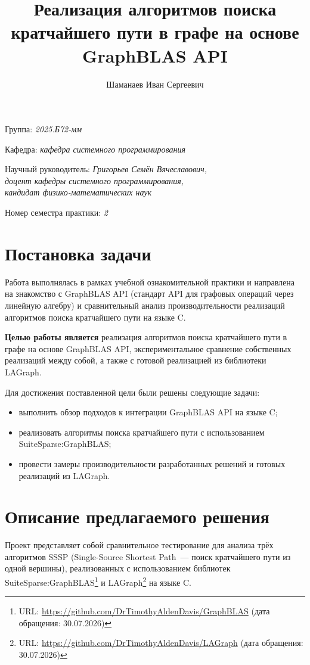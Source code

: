 \documentclass[a4paper]{article}
\title{Реализация алгоритмов поиска кратчайшего пути в графе на основе GraphBLAS API}
\author{Шаманаев Иван Сергеевич}
\date{}
\begin{document}
\maketitle

\begin{flushright}
    Группа: \emph{2025.Б72-мм}

    Кафедра: \emph{кафедра системного программирования}

    Научный руководитель: \emph{Григорьев Семён Вячеславович,}\\
    \emph{доцент кафедры системного программирования,}\\
    \emph{кандидат физико-математических наук}

    Номер семестра практики: \emph{2}
\end{flushright}


\section{Постановка задачи}
Работа выполнялась в рамках учебной ознакомительной практики и направлена на знакомство с GraphBLAS API (стандарт API для графовых операций через линейную алгебру) и сравнительный анализ производительности реализаций алгоритмов поиска кратчайшего пути на языке C.

\textbf{Целью работы является} реализация алгоритмов поиска кратчайшего пути в графе на основе GraphBLAS API, экспериментальное сравнение собственных реализаций между собой, а также с готовой реализацией из библиотеки LAGraph.

Для достижения поставленной цели были решены следующие задачи:
\begin{itemize}
    \item выполнить обзор подходов к интеграции GraphBLAS API на языке C;
    \item реализовать алгоритмы поиска кратчайшего пути с использованием SuiteSparse:GraphBLAS;
    \item провести замеры производительности разработанных решений и готовых реализаций из LAGraph.
\end{itemize}
\section{Описание предлагаемого решения}

Проект представляет собой сравнительное тестирование для анализа трёх алгоритмов SSSP (Single-Source Shortest Path~--- поиск кратчайшего пути из одной вершины), реализованных с использованием библиотек SuiteSparse:GraphBLAS\footnote{URL: \url{https://github.com/DrTimothyAldenDavis/GraphBLAS} (дата обращения: 30.07.2026)} и LAGraph\footnote{URL: \url{https://github.com/DrTimothyAldenDavis/LAGraph} (дата обращения: 30.07.2026)} на языке C.
\end{document}
